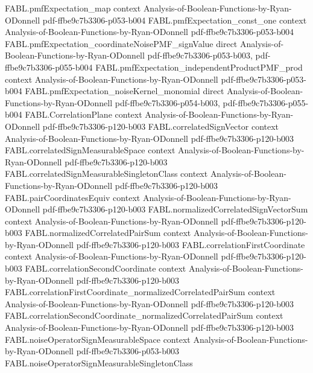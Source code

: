 \begin{theorem}
\proofstep
  {FABL.pmfExpectation_map}
  {context}
  {Analysis-of-Boolean-Functions-by-Ryan-ODonnell}
  {pdf-ffbe9c7b3306-p053-b004}
\proofstep
  {FABL.pmfExpectation_const_one}
  {context}
  {Analysis-of-Boolean-Functions-by-Ryan-ODonnell}
  {pdf-ffbe9c7b3306-p053-b004}
\proofstep
  {FABL.pmfExpectation_coordinateNoisePMF_signValue}
  {direct}
  {Analysis-of-Boolean-Functions-by-Ryan-ODonnell}
  {pdf-ffbe9c7b3306-p053-b003,
    pdf-ffbe9c7b3306-p055-b004}
\proofstep
  {FABL.pmfExpectation_independentProductPMF_prod}
  {context}
  {Analysis-of-Boolean-Functions-by-Ryan-ODonnell}
  {pdf-ffbe9c7b3306-p053-b004}
\proofstep
  {FABL.pmfExpectation_noiseKernel_monomial}
  {direct}
  {Analysis-of-Boolean-Functions-by-Ryan-ODonnell}
  {pdf-ffbe9c7b3306-p054-b003,
    pdf-ffbe9c7b3306-p055-b004}
\proofstep
  {FABL.CorrelationPlane}
  {context}
  {Analysis-of-Boolean-Functions-by-Ryan-ODonnell}
  {pdf-ffbe9c7b3306-p120-b003}
\proofstep
  {FABL.correlatedSignVector}
  {context}
  {Analysis-of-Boolean-Functions-by-Ryan-ODonnell}
  {pdf-ffbe9c7b3306-p120-b003}
\proofstep
  {FABL.correlatedSignMeasurableSpace}
  {context}
  {Analysis-of-Boolean-Functions-by-Ryan-ODonnell}
  {pdf-ffbe9c7b3306-p120-b003}
\proofstep
  {FABL.correlatedSignMeasurableSingletonClass}
  {context}
  {Analysis-of-Boolean-Functions-by-Ryan-ODonnell}
  {pdf-ffbe9c7b3306-p120-b003}
\proofstep
  {FABL.pairCoordinatesEquiv}
  {context}
  {Analysis-of-Boolean-Functions-by-Ryan-ODonnell}
  {pdf-ffbe9c7b3306-p120-b003}
\proofstep
  {FABL.normalizedCorrelatedSignVectorSum}
  {context}
  {Analysis-of-Boolean-Functions-by-Ryan-ODonnell}
  {pdf-ffbe9c7b3306-p120-b003}
\proofstep
  {FABL.normalizedCorrelatedPairSum}
  {context}
  {Analysis-of-Boolean-Functions-by-Ryan-ODonnell}
  {pdf-ffbe9c7b3306-p120-b003}
\proofstep
  {FABL.correlationFirstCoordinate}
  {context}
  {Analysis-of-Boolean-Functions-by-Ryan-ODonnell}
  {pdf-ffbe9c7b3306-p120-b003}
\proofstep
  {FABL.correlationSecondCoordinate}
  {context}
  {Analysis-of-Boolean-Functions-by-Ryan-ODonnell}
  {pdf-ffbe9c7b3306-p120-b003}
\proofstep
  {FABL.correlationFirstCoordinate_normalizedCorrelatedPairSum}
  {context}
  {Analysis-of-Boolean-Functions-by-Ryan-ODonnell}
  {pdf-ffbe9c7b3306-p120-b003}
\proofstep
  {FABL.correlationSecondCoordinate_normalizedCorrelatedPairSum}
  {context}
  {Analysis-of-Boolean-Functions-by-Ryan-ODonnell}
  {pdf-ffbe9c7b3306-p120-b003}
\proofstep
  {FABL.noiseOperatorSignMeasurableSpace}
  {context}
  {Analysis-of-Boolean-Functions-by-Ryan-ODonnell}
  {pdf-ffbe9c7b3306-p053-b003}
\proofstep
  {FABL.noiseOperatorSignMeasurableSingletonClass}

\end{theorem}
